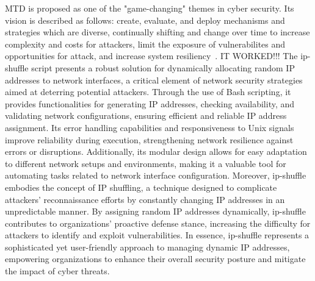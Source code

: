 MTD is proposed as one of the "game-changing" themes in cyber security.
Its vision is described as follows: create, evaluate, and deploy mechanisms
and strategies which are diverse, continually shifting and change over time
to increase complexity and costs for attackers, limit the exposure of vulnerabilites
and opportunities for attack, and increase system resiliency~\cite{cai2016introduction}.
IT WORKED!!!
The ip-shuffle script presents a robust solution for dynamically allocating random IP 
addresses to network interfaces, a critical element of network security strategies aimed 
at deterring potential attackers. Through the use of Bash scripting, it provides functionalities 
for generating IP addresses, checking availability, and validating network configurations, 
ensuring efficient and reliable IP address assignment. Its error handling capabilities and 
responsiveness to Unix signals improve reliability during execution, strengthening network 
resilience against errors or disruptions. Additionally, its modular design allows for easy 
adaptation to different network setups and environments, making it a valuable tool for 
automating tasks related to network interface configuration. Moreover, ip-shuffle embodies 
the concept of IP shuffling, a technique designed to complicate attackers' reconnaissance efforts 
by constantly changing IP addresses in an unpredictable manner. By assigning random IP addresses
dynamically, ip-shuffle contributes to organizations' proactive defense stance, increasing the 
difficulty for attackers to identify and exploit vulnerabilities. In essence, ip-shuffle represents 
a sophisticated yet user-friendly approach to managing dynamic IP addresses, empowering organizations 
to enhance their overall security posture and mitigate the impact of cyber threats.
